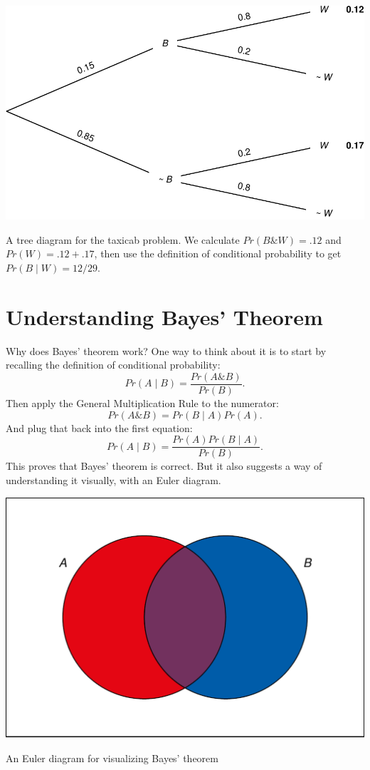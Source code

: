 \documentclass[justified]{tufte-book}
\newcommand{\given}{\mid}
\renewcommand{\wedge}{\mathbin{\&}}
\newcommand{\p}{Pr}
\theoremstyle{definition}
\theoremstyle{definition}
\theoremstyle{definition}
\theoremstyle{definition}
\theoremstyle{remark}
\begin{document}
\begin{marginfigure}
\includegraphics{_main_files/figure-latex/taxitree-1} \caption[A tree diagram for the taxicab problem]{A tree diagram for the taxicab problem. We calculate $\p(B \wedge W) = .12$ and $\p(W) = .12 + .17$, then use the definition of conditional probability to get $\p(B \given W) = 12/29$.}\label{fig:taxitree}
\end{marginfigure}

\hypertarget{understanding-bayes-theorem}{%
\section{Understanding Bayes' Theorem}\label{understanding-bayes-theorem}}

Why does Bayes' theorem work? One way to think about it is to start by recalling the definition of conditional probability:
\[ \p(A \given B) = \frac{\p(A \wedge B)}{\p(B)}. \]
Then apply the General Multiplication Rule to the numerator:
\[ \p(A \wedge B) = \p(B \given A)\p(A).\]
And plug that back into the first equation:
\[ \p(A \given B) = \frac{\p(A) \p(B \given A)}{\p(B)}. \]
This proves that Bayes' theorem is correct. But it also suggests a way of understanding it visually, with an Euler diagram.

\begin{marginfigure}
\includegraphics{_main_files/figure-latex/unnamed-chunk-73-1} \caption[An Euler diagram for visualizing Bayes' theorem]{An Euler diagram for visualizing Bayes' theorem}\label{fig:unnamed-chunk-73}
\end{marginfigure}
\end{document}
